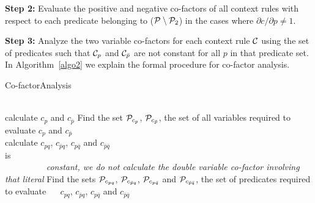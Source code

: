 \vspace{2 mm}
\noindent
 {\bf{Step 2:}} Evaluate the positive and negative co-factors of all 
 	 context rules with respect to 
 	 each predicate belonging to (${\cal{P}} \setminus {\cal{P}}_2$) in the cases where 
 	 $\partial{c}/\partial{p} \ne 1$.
 	 
 \vspace{2 mm}
 \noindent
 {\bf{Step 3:}} Analyze the two variable co-factors for each context rule 
 	 ${{\cal{C}}}$ using the  
     set of predicates such that ${\cal{C}}_p$ and ${\cal{C}}_{\bar{p}}$ 
 	 are not constant for all $p$ in that predicate set.
  \noindent
In Algorithm~\ref{algo2} we explain the formal procedure for co-factor analysis.
 
 
 
\begin{algorithm}[!htb]
  \caption{Co-factorAnalysis}

  \begin{algorithmic}[1]
\\
    \State calculate $c_p$ and $c_{\bar{p}}$
    \State Find the set ${\cal{P}}_{c_{p}}$, ${\cal{P}}_{c_{\bar{p}}}$, the set of all variables 
    required to evaluate $c_p$ and $c_{\bar{p}}$ 
  \EndFor
 \EndFor\\
	\State calculate $c_{pq}$, $c_{\bar{p}q}$, $c_{p\bar{q}}$ and $c_{\bar{p}\bar{q}}$\\
  \indent {} is ~\\
   \indent~~~~~~~~~ {\emph{constant, we do not calculate the double variable co-factor involving that literal}}
	\State Find the sets ${\cal{P}}_{c_{pq}}$, ${\cal{P}}_{c_{\bar{p}q}}$, ${\cal{P}}_{c_{p\bar{q}}}$  
	and ${\cal{P}}_{c_{\bar{p}\bar{q}}}$, the set of predicates required to evaluate 
       \indent~~ $c_{pq}$, $c_{\bar{p}q}$, $c_{p\bar{q}}$ and $c_{\bar{p}\bar{q}}$      
      \EndFor  
   \EndFor
  \end{algorithmic}
  \label{algo2}
\end{algorithm} 

